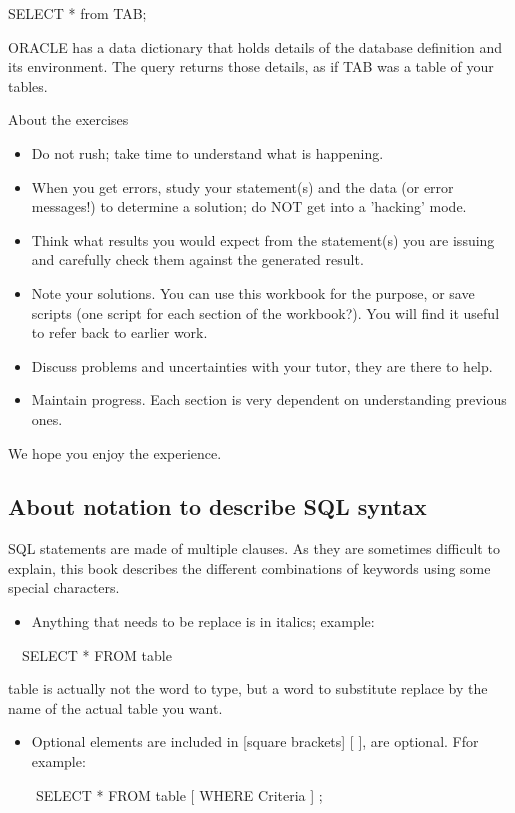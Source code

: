 SELECT  *  from TAB;

ORACLE has a data dictionary that holds details of the database definition and its environment.  The query returns those details, as if {\textquotedbl}TAB{\textquotedbl} was a table of your tables.

About the exercises

\begin{itemize}
\item Do not rush; take time to understand what is happening.
\item When you get errors, study your statement(s) and the data (or error messages!) to determine a solution; do NOT get into a 'hacking' mode.
\item Think what results you would expect from the statement(s) you are issuing and carefully check them against the generated result.
\item Note your solutions. You can use this workbook for the purpose, or save scripts (one script for each section of the workbook?).  You will find it useful to refer back to earlier work.
\item Discuss problems and uncertainties with your tutor, they are there to help.
\item Maintain progress. Each section is very dependent on understanding previous ones.
\end{itemize}
We hope you enjoy the experience.

\subsection{About notation to describe SQL syntax}
SQL statements are made of multiple clauses. As they are sometimes difficult to explain, this book describes the different combinations of keywords using some special characters.

\begin{itemize}
\item Anything that needs to be replace is in italics; example:
\end{itemize}
\ \ SELECT * FROM table

table is actually not the word to type, but a word to substitute replace by the name of the actual table you want.

\begin{itemize}
\item Optional elements are included in [square brackets] [ ], are optional. Ffor example:
\end{itemize}
\ \   \ \ SELECT * FROM table [ WHERE Criteria ] ;

